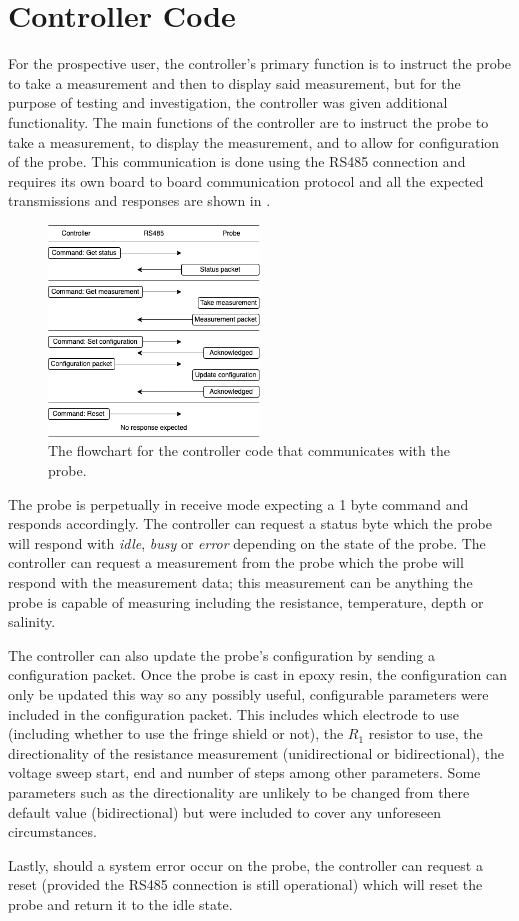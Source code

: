 \section{Controller Code}

For the prospective user, the controller's primary function is to instruct the probe to take a measurement and then to display said measurement, but for the purpose of testing and investigation, the controller was given additional functionality.
The main functions of the controller are to instruct the probe to take a measurement, to display the measurement, and to allow for configuration of the probe.
This communication is done using the RS485 connection and requires its own board to board communication protocol and all the expected transmissions and responses are shown in .

\begin{figure}[h]
    \centering
    \includegraphics[width=0.5\textwidth]{Figures/rs485_flowchart}
    \caption{The flowchart for the controller code that communicates with the probe.}
    \label{fig:rs485-flowchart} %
\end{figure}

The probe is perpetually in receive mode expecting a 1 byte command and responds accordingly.
The controller can request a status byte which the probe will respond with \textit{idle}, \textit{busy} or \textit{error} depending on the state of the probe.
The controller can request a measurement from the probe which the probe will respond with the measurement data; this measurement can be anything the probe is capable of measuring including the resistance, temperature, depth or salinity.

The controller can also update the probe's configuration by sending a configuration packet.
Once the probe is cast in epoxy resin, the configuration can only be updated this way so any possibly useful, configurable parameters were included in the configuration packet.
This includes which electrode to use (including whether to use the fringe shield or not), the $R_1$ resistor to use, the directionality of the resistance measurement (unidirectional or bidirectional), the voltage sweep start, end and number of steps among other parameters.
Some parameters such as the directionality are unlikely to be changed from there default value (bidirectional) but were included to cover any unforeseen circumstances.

Lastly, should a system error occur on the probe, the controller can request a reset (provided the RS485 connection is still operational) which will reset the probe and return it to the idle state.